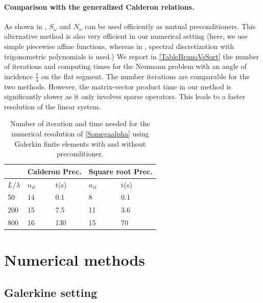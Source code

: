\documentclass[a4paper]{article}
\begin{document}
\paragraph{Comparison with the generalized Calderon relations.} As shown in \cite{bruno2012second}, $S_\omega$ and $N_\omega$ can be used efficiently as mutual preconditioners. This alternative method is also very efficient in our numerical setting (here, we use simple piecewise affine functions, whereas in \cite{bruno2012second}, spectral discretization with trigonometric polynomials is used.) We report in \autoref{TableBrunoVsSqrt} the number of iterations and computing times for the Neumann problem with an angle of incidence $\frac{\pi}{4}$ on the flat segment. The number iterations are comparable for the two methods. However, the matrix-vector product time in our method is significantly slower as it only involves sparse operators. This leads to a faster resolution of the linear system. 

\begin{table}[H]
	\begin{center}
		\begin{tabular}{|| m{4em} | m{4em} | m{4em} | m{4em} | m{4em}||} 
			\hline
			\multicolumn{1}{||c|}{ }&
			\multicolumn{2}{c|}{Calderon Prec.}&\multicolumn{2}{c||}{Square root Prec.}\\
			\hline
			$L/\lambda$ & $n_{it}$& t(s) & $n_{it}$ & t(s)\\
			\hline\hline
			50 & 14 & 0.1 & 8 & 0.1\\
			\hline
			200 & 15 & 7.5 & 11 &  3.6\\
			\hline
			800 & 16 & 130 & 15 & 70\\
			\hline
		\end{tabular}
	\end{center}
	\caption{Number of iteration and time needed for the numerical resolution of \eqref{Somegaalpha} using Galerkin finite elements with and without preconditioner.}
	\label{TableBrunoVsSqrt}
\end{table}

\section{Numerical methods}


\subsection{Galerkine setting}

\label{subsec:GalerkineSetting}
\end{document}
